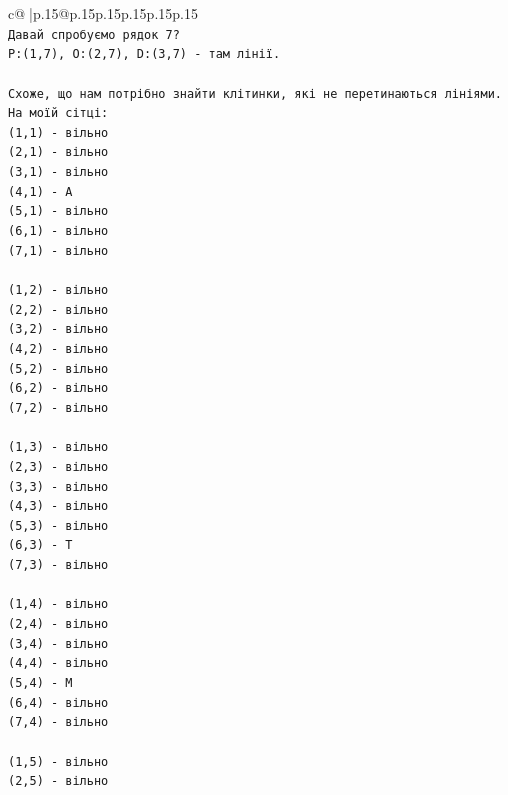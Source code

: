 \documentclass{article}
\begin{document}
{\begin{supertabular}{c@{$\;$}|p{.15\linewidth}@{}p{.15\linewidth}p{.15\linewidth}p{.15\linewidth}p{.15\linewidth}p{.15\linewidth}}
{{{\\ 
\texttt{Давай спробуємо рядок 7?} \\
\texttt{P:(1,7), O:(2,7), D:(3,7) {-} там лінії.} \\
\\ 
\texttt{Схоже, що нам потрібно знайти клітинки, які не перетинаються лініями. На моїй сітці:} \\
\texttt{(1,1) {-} вільно} \\
\texttt{(2,1) {-} вільно} \\
\texttt{(3,1) {-} вільно} \\
\texttt{(4,1) {-} A} \\
\texttt{(5,1) {-} вільно} \\
\texttt{(6,1) {-} вільно} \\
\texttt{(7,1) {-} вільно} \\
\\ 
\texttt{(1,2) {-} вільно} \\
\texttt{(2,2) {-} вільно} \\
\texttt{(3,2) {-} вільно} \\
\texttt{(4,2) {-} вільно} \\
\texttt{(5,2) {-} вільно} \\
\texttt{(6,2) {-} вільно} \\
\texttt{(7,2) {-} вільно} \\
\\ 
\texttt{(1,3) {-} вільно} \\
\texttt{(2,3) {-} вільно} \\
\texttt{(3,3) {-} вільно} \\
\texttt{(4,3) {-} вільно} \\
\texttt{(5,3) {-} вільно} \\
\texttt{(6,3) {-} T} \\
\texttt{(7,3) {-} вільно} \\
\\ 
\texttt{(1,4) {-} вільно} \\
\texttt{(2,4) {-} вільно} \\
\texttt{(3,4) {-} вільно} \\
\texttt{(4,4) {-} вільно} \\
\texttt{(5,4) {-} M} \\
\texttt{(6,4) {-} вільно} \\
\texttt{(7,4) {-} вільно} \\
\\ 
\texttt{(1,5) {-} вільно} \\
\texttt{(2,5) {-} вільно} \\
}}}
\end{supertabular}}
\end{document}
